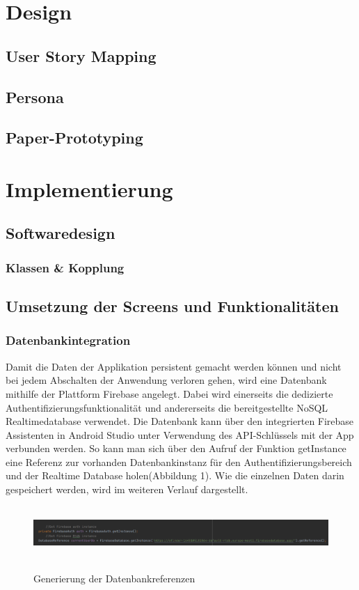 \documentclass[12pt, a4paper, oneside]{article}
\begin{document}
\section{Design}
\subsection{User Story Mapping}
\subsection{Persona}
\subsection{Paper-Prototyping}

\section{Implementierung}
\subsection{Softwaredesign}
\subsubsection{Klassen \& Kopplung}
\subsection{Umsetzung der Screens und Funktionalitäten}
\subsubsection{Datenbankintegration}
Damit die Daten der Applikation persistent gemacht werden können und nicht bei jedem Abschalten der Anwendung verloren gehen, wird eine Datenbank mithilfe der Plattform Firebase angelegt. Dabei wird einerseits die dedizierte Authentifizierungsfunktionalität und andererseits die bereitgestellte NoSQL Realtimedatabase verwendet. Die Datenbank kann über den integrierten Firebase Assistenten in Android Studio unter Verwendung des API-Schlüssels mit der App verbunden werden. So kann man sich über den Aufruf der Funktion getInstance eine Referenz zur vorhanden Datenbankinstanz für den Authentifizierungsbereich und der Realtime Database holen(Abbildung 1). Wie die einzelnen Daten darin gespeichert werden, wird im weiteren Verlauf dargestellt.\\
\newpage
\begin{figure}
\includegraphics[width=1\textwidth, height=2cm]{firebase_connect.png}
\centering
\label{input_check}
\caption{Generierung der Datenbankreferenzen}
\end{figure}
\end{document}
